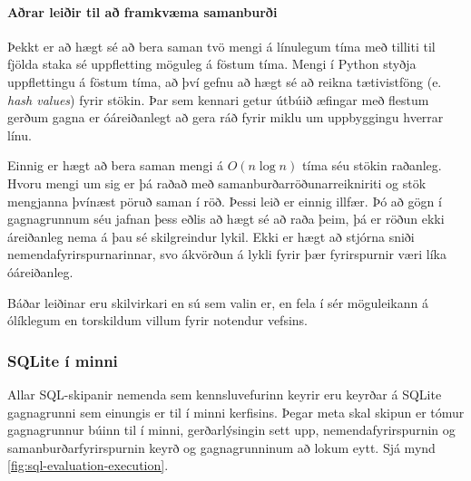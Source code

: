 \documentclass[a4paper,12pt,twoside,BCOR=10mm]{scrbook}
\begin{document}
\paragraph{Aðrar leiðir til að framkvæma samanburði} Þekkt er að hægt sé að bera saman tvö mengi á línulegum tíma með tilliti til fjölda staka sé uppfletting möguleg á föstum tíma. Mengi í Python styðja uppflettingu á föstum tíma, að því gefnu að hægt sé að reikna tætivistföng (e. \emph{hash values}) fyrir stökin. Þar sem kennari getur útbúið æfingar með flestum gerðum gagna er óáreiðanlegt að gera ráð fyrir miklu um uppbyggingu hverrar línu.

Einnig er hægt að bera saman mengi á $O(n\log n)$ tíma séu stökin raðanleg. Hvoru mengi um sig er þá raðað með samanburðarröðunarreikniriti og stök mengjanna þvínæst pöruð saman í röð. Þessi leið er einnig illfær. Þó að gögn í gagnagrunnum séu jafnan þess eðlis að hægt sé að raða þeim, þá er röðun ekki áreiðanleg nema á þau sé skilgreindur lykil. Ekki er hægt að stjórna sniði nemendafyrirspurnarinnar, svo ákvörðun á lykli fyrir þær fyrirspurnir væri líka óáreiðanleg.

Báðar leiðinar eru skilvirkari en sú sem valin er, en fela í sér möguleikann á ólíklegum en torskildum villum fyrir notendur vefsins.
\subsubsection{SQLite í minni}
Allar SQL-skipanir nemenda sem kennsluvefurinn keyrir eru keyrðar á SQLite gagnagrunni sem einungis er til í minni kerfisins. Þegar meta skal skipun er tómur gagnagrunnur búinn til í minni, gerðarlýsingin sett upp, nemendafyrirspurnin og samanburðarfyrirspurnin keyrð og gagnagrunninum að lokum eytt. Sjá mynd \ref{fig:sql-evaluation-execution}.
\end{document}

